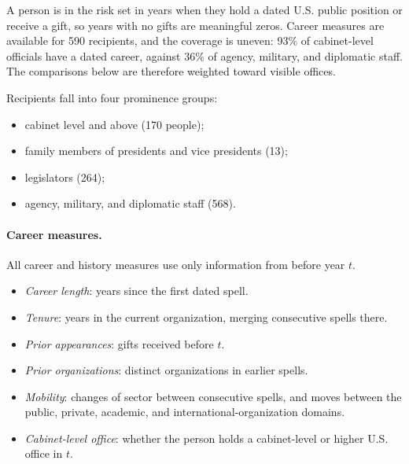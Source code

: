 \documentclass[11pt]{article}
\begin{document}
A person is in the risk set in years when they hold a dated U.S. public position or receive a gift, so years with no gifts are meaningful zeros. Career measures are available for 590 recipients, and the coverage is uneven: 93\% of cabinet-level officials have a dated career, against 36\% of agency, military, and diplomatic staff. The comparisons below are therefore weighted toward visible offices.

Recipients fall into four prominence groups:
\begin{itemize}
\item cabinet level and above (170 people);
\item family members of presidents and vice presidents (13);
\item legislators (264);
\item agency, military, and diplomatic staff (568).
\end{itemize}

\paragraph{Career measures.} All career and history measures use only information from before year $t$.
\begin{itemize}
\item \emph{Career length}: years since the first dated spell.
\item \emph{Tenure}: years in the current organization, merging consecutive spells there.
\item \emph{Prior appearances}: gifts received before $t$.
\item \emph{Prior organizations}: distinct organizations in earlier spells.
\item \emph{Mobility}: changes of sector between consecutive spells, and moves between the public, private, academic, and international-organization domains.
\item \emph{Cabinet-level office}: whether the person holds a cabinet-level or higher U.S. office in $t$.
\end{itemize}
\end{document}

